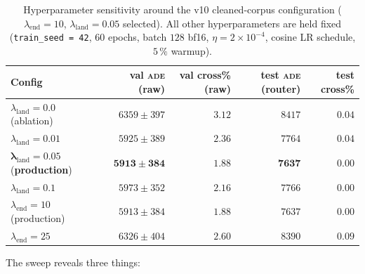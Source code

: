 \documentclass[oneside, a4paper, onecolumn, 11pt]{article}
\newcommand{\ade}{\textsc{ade}}
\begin{document}
\begin{table}[h]
\centering
\caption{Hyperparameter sensitivity around the v10 cleaned-corpus
configuration ($\lambda_{\mathrm{end}} = 10$,
$\lambda_{\mathrm{land}} = 0.05$ selected).  All other
hyperparameters are held fixed (\texttt{train\_seed = 42}, $60$
epochs, batch $128$ bf16, $\eta = 2 \times 10^{-4}$, cosine LR
schedule, $5\,\%$ warmup).}
\label{tab:hpsens}
\begin{tabular}{lrrrr}
\toprule
\textbf{Config}                          & val \ade{} (raw) & val cross\% (raw) & test \ade{} (router) & test cross\% \\
\midrule
$\lambda_{\mathrm{land}} = 0.0$ (ablation)     & $6359 \pm 397$ & $3.12$ & $8417$ & $0.04$ \\
$\lambda_{\mathrm{land}} = 0.01$               & $5925 \pm 389$ & $2.36$ & $7764$ & $0.04$ \\
$\boldsymbol{\lambda_{\mathrm{land}} = 0.05}$ (\textbf{production}) & $\mathbf{5913 \pm 384}$ & $\mathbf{1.88}$ & $\mathbf{7637}$ & $\mathbf{0.00}$ \\
$\lambda_{\mathrm{land}} = 0.1$                & $5973 \pm 352$ & $2.16$ & $7766$ & $0.00$ \\
\midrule
$\lambda_{\mathrm{end}} = 10$ (production)     & $5913 \pm 384$ & $1.88$ & $7637$ & $0.00$ \\
$\lambda_{\mathrm{end}} = 25$                  & $6326 \pm 404$ & $2.60$ & $8390$ & $0.09$ \\
\bottomrule
\end{tabular}
\end{table}

The sweep reveals three things:
\end{document}
